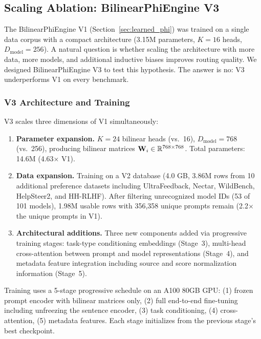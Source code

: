 \subsection{Scaling Ablation: BilinearPhiEngine V3}
\label{sec:v3_ablation}

The BilinearPhiEngine V1 (Section~\ref{sec:learned_phi}) was trained on a single data corpus with a compact architecture (3.15M parameters, $K=16$ heads, $D_{\text{model}}=256$). A natural question is whether scaling the architecture with more data, more models, and additional inductive biases improves routing quality. We designed BilinearPhiEngine V3 to test this hypothesis. The answer is no: V3 underperforms V1 on every benchmark.

\subsubsection{V3 Architecture and Training}

V3 scales three dimensions of V1 simultaneously:

\begin{enumerate}
    \item \textbf{Parameter expansion.} $K=24$ bilinear heads (vs.\ 16), $D_{\text{model}}=768$ (vs.\ 256), producing bilinear matrices $\mathbf{W}_i \in \mathbb{R}^{768 \times 768}$. Total parameters: 14.6M (4.63$\times$ V1).
    \item \textbf{Data expansion.} Training on a V2 database (4.0 GB, 3.86M rows from 10 additional preference datasets including UltraFeedback, Nectar, WildBench, HelpSteer2, and HH-RLHF). After filtering unrecognized model IDs (53 of 101 models), 1.98M usable rows with 356,358 unique prompts remain (2.2$\times$ the unique prompts in V1).
    \item \textbf{Architectural additions.} Three new components added via progressive training stages: task-type conditioning embeddings (Stage~3), multi-head cross-attention between prompt and model representations (Stage~4), and metadata feature integration including source and score normalization information (Stage~5).
\end{enumerate}

Training uses a 5-stage progressive schedule on an A100 80GB GPU: (1) frozen prompt encoder with bilinear matrices only, (2) full end-to-end fine-tuning including unfreezing the sentence encoder, (3) task conditioning, (4) cross-attention, (5) metadata features. Each stage initializes from the previous stage's best checkpoint.

